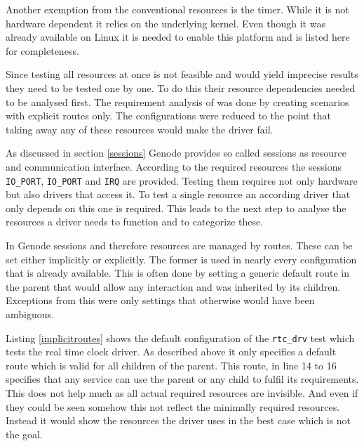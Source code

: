 \documentclass[
a4paper,
12pt,
notitlepage,
parskip=half,
DIV=11,
]{scrbook}
\begin{document}
		Another exemption from the conventional resources is the timer.
		While it is not hardware dependent it relies on the underlying kernel.
		Even though it was already available on Linux it is needed to enable this platform and is listed here for completeness.
		
		
		Since testing all resources at once is not feasible and would yield imprecise results they need to be tested one by one.
		To do this their resource dependencies needed to be analysed first.
		The requirement analysis of was done by creating scenarios with explicit routes only.
		The configurations were reduced to the point that taking away any of these resources would make the driver fail.
		
		As discussed in section \ref{sessions} Genode provides so called sessions as resource and communication interface.
		According to the required resources the sessions \texttt{IO\_PORT}, \texttt{IO\_PORT} and \texttt{IRQ} are provided.
		Testing them requires not only hardware but also drivers that access it.
		To test a single resource an according driver that only depends on this one is required.
		This leads to the next step to analyse the resources a driver needs to function and to categorize these.
		
		In Genode sessions and therefore resources are managed by routes.
		These can be set either implicitly or explicitly.
		The former is used in nearly every configuration that is already available.
		This is often done by setting a generic default route in the parent that would allow any interaction and was inherited by its children.
		Exceptions from this were only settings that otherwise would have been ambiguous.
		
		Listing \ref{implicitroutes} shows the default configuration of the \texttt{rtc\_drv} test which tests the real time clock driver.
		As described above it only specifies a default route which is valid for all children of the parent.
		This route, in line 14 to 16 specifies that any service can use the parent or any child to fulfil its requirements.
		This does not help much as all actual required resources are invisible.
		And even if they could be seen somehow this not reflect the minimally required resources.
		Instead it would show the resources the driver uses in the best case which is not the goal.
		
\end{document}
